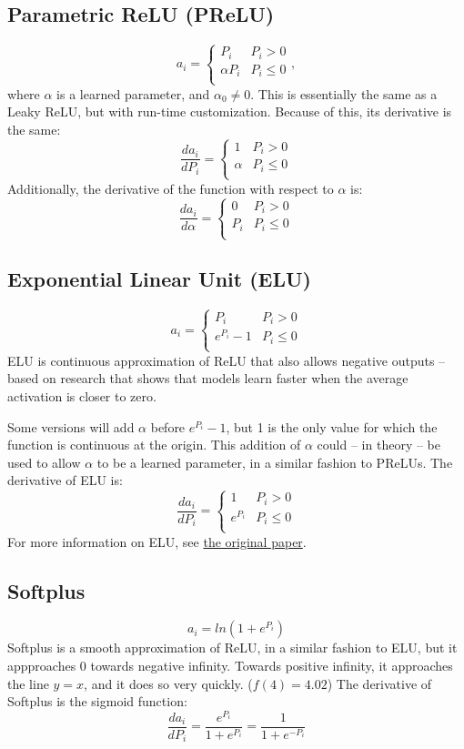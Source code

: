 \documentclass[fleqn]{article}
\begin{document}
\subsection{Parametric ReLU (PReLU)}
\[ a_i = \begin{cases}
	P_i & P_i > 0\\
	\alpha P_i & P_i \leq 0\\
\end{cases}, \]
where $\alpha$ is a learned parameter, and $\alpha_0 \neq 0$. This is
essentially the same as a Leaky ReLU, but with run-time customization.
Because of this, its derivative is the same:
\[ \frac{d a_i}{d P_i} = \begin{cases}
	1 & P_i > 0\\
	\alpha & P_i \leq 0\\
\end{cases} \]
Additionally, the derivative of the function with respect to $\alpha$ is:
\[ \frac{d a_i}{d \alpha} = \begin{cases}
	0 & P_i > 0\\
	P_i & P_i \leq 0\\
\end{cases} \]

\subsection{Exponential Linear Unit (ELU)}
\[ a_i = \begin{cases}
	P_i & P_i > 0 \\
	e^{P_i} -1 & P_i \leq 0 \\
\end{cases} \]
ELU is continuous approximation of ReLU that also allows negative
outputs -- based on research that shows that models learn faster when the
average activation is closer to zero.

Some versions will add $\alpha$ before $e^{P_i} -1$, but 1 is the only
value for which the function is continuous at the origin. This addition
of $\alpha$ could -- in theory -- be used to allow $\alpha$ to be a
learned parameter, in a similar fashion to PReLUs. The derivative of ELU
is:
\[ \frac{d a_i}{d P_i} = \begin{cases}
	1 & P_i > 0\\
	e^{P_i} & P_i \leq 0\\
\end{cases} \]
For more information on ELU, see
\href{https://arxiv.org/pdf/1511.07289.pdf}{the original paper}.

\subsection{Softplus}
\[ a_i = ln(1 + e^{P_i}) \]
Softplus is a smooth approximation of ReLU, in a similar fashion to ELU,
but it appproaches 0 towards negative infinity. Towards positive infinity,
it approaches the line $y=x$, and it does so very quickly. ($f(4)=4.02$)
The derivative of Softplus is the sigmoid function:
\[ \frac{d a_i}{d P_i} = \frac{e^{P_i}}{1 + e^{P_i}} = \frac{1}{1 + e^{-P_i}} \]
\end{document}
